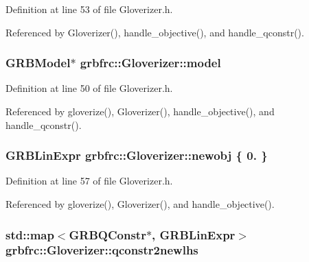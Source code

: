 Definition at line 53 of file Gloverizer.\+h.



Referenced by Gloverizer(), handle\+\_\+objective(), and handle\+\_\+qconstr().

\subsubsection[{\texorpdfstring{model}{model}}]{\setlength{\rightskip}{0pt plus 5cm}G\+R\+B\+Model$\ast$ grbfrc\+::\+Gloverizer\+::model\hspace{0.3cm}{\ttfamily [private]}}\hypertarget{classgrbfrc_1_1Gloverizer_a80edd56f6e5b43696506593a766ef989}{}\label{classgrbfrc_1_1Gloverizer_a80edd56f6e5b43696506593a766ef989}


Definition at line 50 of file Gloverizer.\+h.



Referenced by gloverize(), Gloverizer(), handle\+\_\+objective(), and handle\+\_\+qconstr().

\subsubsection[{\texorpdfstring{newobj}{newobj}}]{\setlength{\rightskip}{0pt plus 5cm}G\+R\+B\+Lin\+Expr grbfrc\+::\+Gloverizer\+::newobj \{ 0. \}\hspace{0.3cm}{\ttfamily [private]}}\hypertarget{classgrbfrc_1_1Gloverizer_a38a674b64d09932859b9a0efd3acf723}{}\label{classgrbfrc_1_1Gloverizer_a38a674b64d09932859b9a0efd3acf723}


Definition at line 57 of file Gloverizer.\+h.



Referenced by gloverize(), Gloverizer(), and handle\+\_\+objective().

\subsubsection[{\texorpdfstring{qconstr2newlhs}{qconstr2newlhs}}]{\setlength{\rightskip}{0pt plus 5cm}std\+::map$<$G\+R\+B\+Q\+Constr$\ast$, G\+R\+B\+Lin\+Expr$>$ grbfrc\+::\+Gloverizer\+::qconstr2newlhs\hspace{0.3cm}{\ttfamily [private]}}\hypertarget{classgrbfrc_1_1Gloverizer_a2cc2507852bba8494b917aaed8a38d6a}{}\label{classgrbfrc_1_1Gloverizer_a2cc2507852bba8494b917aaed8a38d6a}


